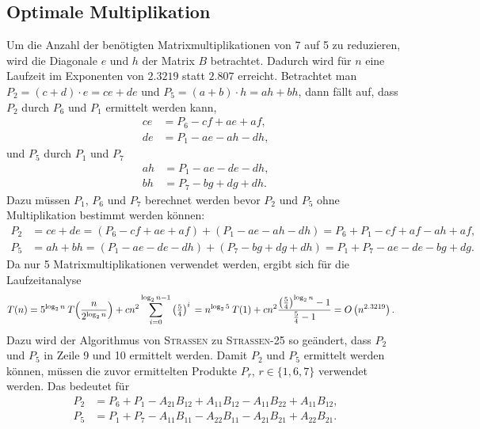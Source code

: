 \documentclass[oneside]{scrbook}
\numberwithin{equation}{section}
\begin{document}
\subsection{Optimale Multiplikation}
Um die Anzahl der benötigten Matrixmultiplikationen von 7 auf 5 zu reduzieren, wird die Diagonale $e$ und $h$ der Matrix $B$ betrachtet. Dadurch wird für $n$ eine Laufzeit im Exponenten von $2.3219$ statt $2.807$ erreicht. Betrachtet man $P_2 = (c + d) \cdot e = ce + de$ und $P_5 = (a + b) \cdot h = ah + bh$, dann fällt auf, dass $P_2$ durch $P_6$ und $P_1$ ermittelt werden kann,
\begin{align*}
	ce &= P_6 - cf + ae + af, \\
	de &= P_1 - ae - ah - dh,
\end{align*}
und $P_5$ durch $P_1$ und $P_7$
\begin{align*}
	ah &= P_1 - ae - de - dh, \\
	bh &= P_7 - bg + dg + dh.
\end{align*}
Dazu müssen $P_1$, $P_6$ und $P_7$ berechnet werden bevor $P_2$ und $P_5$ ohne Multiplikation bestimmt werden können:
\begin{align*}
	P_2 &= ce + de = (P_6 - cf + ae + af) + (P_1 - ae - ah - dh) = P_6 + P_1 - cf + af - ah + af, \\
	P_5 &= ah + bh = (P_1 - ae - de - dh) + (P_7 - bg + dg + dh) = P_1 + P_7 - ae - de - bg + dg.
\end{align*}
Da nur 5 Matrixmultiplikationen verwendet werden, ergibt sich für die Laufzeitanalyse 
\begin{align*}
	\vphantom{\rule{0pt}{2.5ex}} T(n) &= 5^{\log_{2}n} \: T\Big(\frac{n}{2^{\log_{2}n}}\Big) + cn^2 \sum_{i = 0}^{\log_{2}n-1} \left(\tfrac{5}{4}\right)^i
	\vphantom{\rule{0pt}{2.5ex}} = n^{\log_{2}5} \: T(1) + cn^2 \frac{\left(\tfrac{5}{4}\right)^{\log_{2}n} - 1}{\tfrac{5}{4} - 1}
	\vphantom{\rule{0pt}{2.5ex}} = O\left(n^{2.3219}\right).
\end{align*}
Dazu wird der Algorithmus von \textsc{Strassen} zu \textsc{Strassen-25} so geändert, dass $P_2$ und $P_5$ in Zeile 9 und 10 ermittelt werden. Damit $P_2$ und $P_5$ ermittelt werden können, müssen die zuvor ermittelten Produkte $P_r$, $r \in \{1, 6, 7\}$ verwendet werden. Das bedeutet für 
\begin{align*}
	P_2 &= P_6 + P_1 - A_{21}B_{12} + A_{11}B_{12} - A_{11}B_{22} + A_{11}B_{12}, \\
	P_5 &= P_1 + P_7 - A_{11}B_{11} - A_{22}B_{11} - A_{21}B_{21} + A_{22}B_{21}.
\end{align*}
\end{document}

